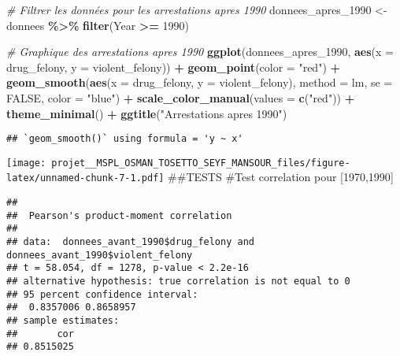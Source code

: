\documentclass[
]{article}
\newenvironment{Shaded}{\begin{snugshade}}{\end{snugshade}}
\newcommand{\AttributeTok}[1]{\textcolor[rgb]{0.13,0.29,0.53}{#1}}
\newcommand{\CommentTok}[1]{\textcolor[rgb]{0.56,0.35,0.01}{\textit{#1}}}
\newcommand{\ConstantTok}[1]{\textcolor[rgb]{0.56,0.35,0.01}{#1}}
\newcommand{\DecValTok}[1]{\textcolor[rgb]{0.00,0.00,0.81}{#1}}
\newcommand{\FunctionTok}[1]{\textcolor[rgb]{0.13,0.29,0.53}{\textbf{#1}}}
\newcommand{\NormalTok}[1]{#1}
\newcommand{\OtherTok}[1]{\textcolor[rgb]{0.56,0.35,0.01}{#1}}
\newcommand{\SpecialCharTok}[1]{\textcolor[rgb]{0.81,0.36,0.00}{\textbf{#1}}}
\newcommand{\StringTok}[1]{\textcolor[rgb]{0.31,0.60,0.02}{#1}}
\begin{document}
\begin{Shaded}
\begin{Highlighting}[]
\CommentTok{\# Filtrer les données pour les arrestations apres 1990}
\NormalTok{donnees\_apres\_1990 }\OtherTok{\textless{}{-}}\NormalTok{ donnees }\SpecialCharTok{\%\textgreater{}\%} \FunctionTok{filter}\NormalTok{(Year }\SpecialCharTok{\textgreater{}=} \DecValTok{1990}\NormalTok{)}

\CommentTok{\# Graphique des arrestations apres 1990}
\FunctionTok{ggplot}\NormalTok{(donnees\_apres\_1990, }\FunctionTok{aes}\NormalTok{(}\AttributeTok{x =}\NormalTok{ drug\_felony, }\AttributeTok{y =}\NormalTok{ violent\_felony)) }\SpecialCharTok{+} 
  \FunctionTok{geom\_point}\NormalTok{(}\AttributeTok{color =} \StringTok{"red"}\NormalTok{) }\SpecialCharTok{+}
  \FunctionTok{geom\_smooth}\NormalTok{(}\FunctionTok{aes}\NormalTok{(}\AttributeTok{x =}\NormalTok{ drug\_felony, }\AttributeTok{y =}\NormalTok{ violent\_felony), }\AttributeTok{method =}\NormalTok{ lm, }\AttributeTok{se =} \ConstantTok{FALSE}\NormalTok{, }\AttributeTok{color =} \StringTok{"blue"}\NormalTok{) }\SpecialCharTok{+}
  \FunctionTok{scale\_color\_manual}\NormalTok{(}\AttributeTok{values =} \FunctionTok{c}\NormalTok{(}\StringTok{"red"}\NormalTok{)) }\SpecialCharTok{+}
  \FunctionTok{theme\_minimal}\NormalTok{() }\SpecialCharTok{+}
  \FunctionTok{ggtitle}\NormalTok{(}\StringTok{"Arrestations apres 1990"}\NormalTok{)}
\end{Highlighting}
\end{Shaded}

\begin{verbatim}
## `geom_smooth()` using formula = 'y ~ x'
\end{verbatim}

\texttt{[image: projet\_\_MSPL\_OSMAN\_TOSETTO\_SEYF\_MANSOUR\_files/figure-latex/unnamed-chunk-7-1.pdf]}
\#\#TESTS \#Test correlation pour {[}1970,1990{]}

\begin{Shaded}
\end{Shaded}

\begin{verbatim}
## 
##  Pearson's product-moment correlation
## 
## data:  donnees_avant_1990$drug_felony and donnees_avant_1990$violent_felony
## t = 58.054, df = 1278, p-value < 2.2e-16
## alternative hypothesis: true correlation is not equal to 0
## 95 percent confidence interval:
##  0.8357006 0.8658957
## sample estimates:
##       cor 
## 0.8515025
\end{verbatim}
\end{document}

